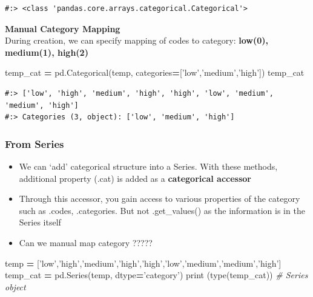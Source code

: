 \documentclass[
]{book}
\newenvironment{Shaded}{\begin{snugshade}}{\end{snugshade}}
\newcommand{\BuiltInTok}[1]{#1}
\newcommand{\CommentTok}[1]{\textcolor[rgb]{0.37,0.37,0.37}{\textit{#1}}}
\newcommand{\NormalTok}[1]{#1}
\newcommand{\OperatorTok}[1]{\textcolor[rgb]{0.43,0.43,0.43}{\textbf{#1}}}
\newcommand{\StringTok}[1]{\textcolor[rgb]{0.5,0.5,0.5}{#1}}
\providecommand{\tightlist}{%
  \setlength{\itemsep}{0pt}\setlength{\parskip}{0pt}}
\begin{document}
\begin{verbatim}
#:> <class 'pandas.core.arrays.categorical.Categorical'>
\end{verbatim}

\textbf{Manual Category Mapping}\\
During creation, we can specify mapping of codes to category: \textbf{low(0), medium(1), high(2)}

\begin{Shaded}
\begin{Highlighting}[]
\NormalTok{temp_cat }\OperatorTok{=}\NormalTok{ pd.Categorical(temp, categories}\OperatorTok{=}\NormalTok{[}\StringTok{'low'}\NormalTok{,}\StringTok{'medium'}\NormalTok{,}\StringTok{'high'}\NormalTok{])}
\NormalTok{temp_cat}
\end{Highlighting}
\end{Shaded}

\begin{verbatim}
#:> ['low', 'high', 'medium', 'high', 'high', 'low', 'medium', 'medium', 'high']
#:> Categories (3, object): ['low', 'medium', 'high']
\end{verbatim}

\hypertarget{from-series}{%
\subsubsection{From Series}\label{from-series}}

\begin{itemize}
\tightlist
\item
  We can `add' categorical structure into a Series. With these methods, additional property (.cat) is added as a \textbf{categorical accessor}\\
\item
  Through this accessor, you gain access to various properties of the category such as .codes, .categories. But not .get\_values() as the information is in the Series itself\\
\item
  Can we manual map category ?????
\end{itemize}

\begin{Shaded}
\begin{Highlighting}[]
\NormalTok{temp }\OperatorTok{=}\NormalTok{ [}\StringTok{'low'}\NormalTok{,}\StringTok{'high'}\NormalTok{,}\StringTok{'medium'}\NormalTok{,}\StringTok{'high'}\NormalTok{,}\StringTok{'high'}\NormalTok{,}\StringTok{'low'}\NormalTok{,}\StringTok{'medium'}\NormalTok{,}\StringTok{'medium'}\NormalTok{,}\StringTok{'high'}\NormalTok{]}
\NormalTok{temp_cat }\OperatorTok{=}\NormalTok{ pd.Series(temp, dtype}\OperatorTok{=}\StringTok{'category'}\NormalTok{)}
\BuiltInTok{print}\NormalTok{ (}\BuiltInTok{type}\NormalTok{(temp_cat))       }\CommentTok{# Series object}
\end{Highlighting}
\end{Shaded}
\end{document}
